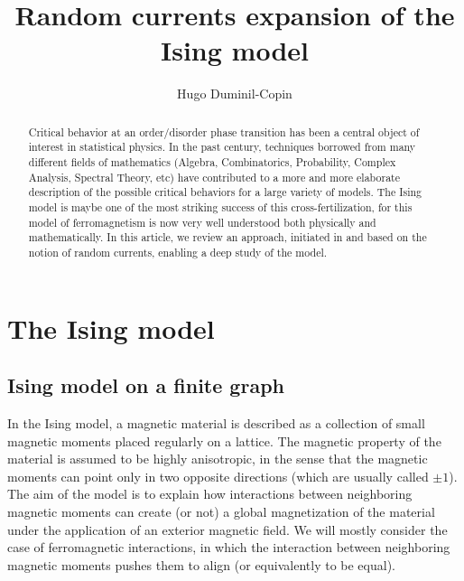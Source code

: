 \documentclass[a4paper,oneside,11pt]{article}
\title{Random currents expansion of the Ising model}
\author{Hugo Duminil-Copin}
\begin{document}
\newcommand{\lr}[1][]{\stackrel{#1}\longleftrightarrow}

\newcommand{\nlr}[1][]{\overset{#1}{\not\longleftrightarrow}}

\maketitle


\begin{abstract}
Critical behavior at an order/disorder phase transition has been a central object of interest in statistical physics. In the past century, techniques borrowed from many different fields of mathematics (Algebra, Combinatorics, Probability, Complex Analysis, Spectral Theory, etc) have contributed to a more and more elaborate description of the possible critical behaviors for a large variety of models. The Ising model is maybe one of the most striking success of this cross-fertilization, for this model of ferromagnetism is now very well understood both physically and mathematically. In this article, we review an approach, initiated in \cite{GriHurShe70,Aiz82} and based on the notion of random currents, enabling a deep study of the model. 
\end{abstract}

\vspace{-2mm}
\section{The Ising model}

\subsection{Ising model on a finite graph} In the Ising model, a magnetic material is described as a collection of small magnetic moments placed regularly on a lattice. The magnetic property of the material is assumed to be highly anisotropic, in the sense that the  magnetic moments can point only in two opposite directions (which are usually called $\pm1$). The aim of the model is to explain how interactions between neighboring magnetic moments can create (or not) a global magnetization of the material under the application of an exterior magnetic field. We will mostly consider the case of ferromagnetic interactions, in which the interaction between neighboring magnetic moments pushes them to align (or equivalently to be equal).
\end{document}
